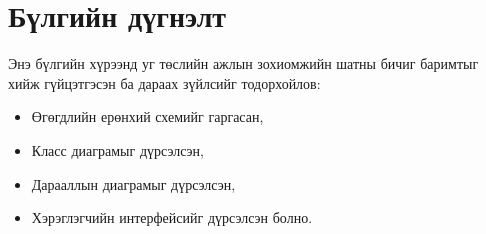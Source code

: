 
\section{Бүлгийн дүгнэлт}
Энэ бүлгийн хүрээнд уг төслийн ажлын зохиомжийн шатны бичиг баримтыг хийж гүйцэтгэсэн ба дараах зүйлсийг тодорхойлов:
\begin{itemize}[label={--}]
    \renewcommand\labelitemi{--}
    \item Өгөгдлийн ерөнхий схемийг гаргасан,
    \item Класс диаграмыг дүрсэлсэн,
    \item Дарааллын диаграмыг дүрсэлсэн,
    \item Хэрэглэгчийн интерфейсийг дүрсэлсэн болно.
\end{itemize}
